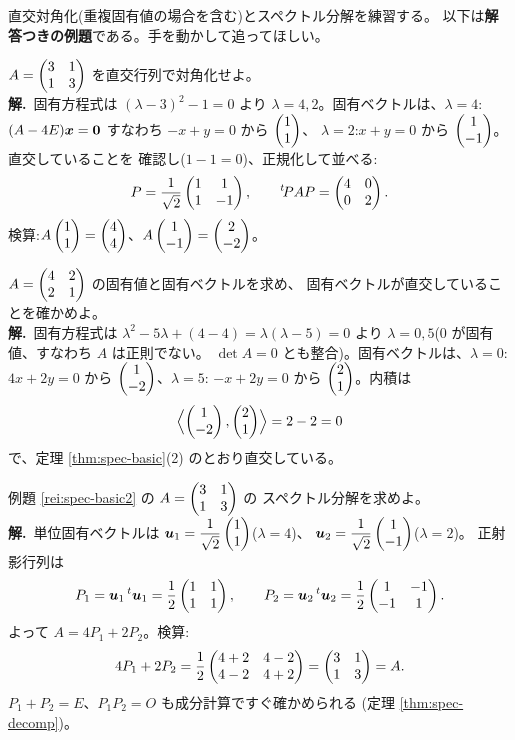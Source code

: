 直交対角化(重複固有値の場合を含む)とスペクトル分解を練習する。
以下は\textbf{解答つきの例題}である。手を動かして追ってほしい。

\begin{rei}[例題・基本($2$ 次の直交対角化)]\label{rei:spec-basic2}
$A = \begin{pmatrix}3 & 1 \\ 1 & 3\end{pmatrix}$ を直交行列で対角化せよ。\\
\textbf{解.}\ 固有方程式は $(\lambda - 3)^2 - 1 = 0$ より
$\lambda = 4, 2$。固有ベクトルは、$\lambda = 4$:
$(A - 4E)\bm{x} = \bm{0}$ すなわち $-x + y = 0$ から $\begin{pmatrix}1 \\ 1\end{pmatrix}$、
$\lambda = 2$:$x + y = 0$ から $\begin{pmatrix}1 \\ -1\end{pmatrix}$。直交していることを
確認し($1 - 1 = 0$)、正規化して並べる:
\[
P = \frac{1}{\sqrt{2}}\begin{pmatrix}1 & 1 \\ 1 & -1\end{pmatrix}, \qquad
{}^t\!PAP = \begin{pmatrix}4 & 0 \\ 0 & 2\end{pmatrix}.
\]
検算:$A\begin{pmatrix}1 \\ 1\end{pmatrix} = \begin{pmatrix}4 \\ 4\end{pmatrix}$、$A\begin{pmatrix}1 \\ -1\end{pmatrix} = \begin{pmatrix}2 \\ -2\end{pmatrix}$。
\end{rei}

\begin{rei}[例題・基本(直交性の検証)]\label{rei:spec-orthcheck}
$A = \begin{pmatrix}4 & 2 \\ 2 & 1\end{pmatrix}$ の固有値と固有ベクトルを求め、
固有ベクトルが直交していることを確かめよ。\\
\textbf{解.}\ 固有方程式は
$\lambda^2 - 5\lambda + (4 - 4) = \lambda(\lambda - 5) = 0$ より
$\lambda = 0, 5$($0$ が固有値、すなわち $A$ は正則でない。
$\det A = 0$ とも整合)。固有ベクトルは、$\lambda = 0$:
$4x + 2y = 0$ から $\begin{pmatrix}1 \\ -2\end{pmatrix}$、$\lambda = 5$:
$-x + 2y = 0$ から $\begin{pmatrix}2 \\ 1\end{pmatrix}$。内積は
\[
\Bigl\langle \begin{pmatrix}1 \\ -2\end{pmatrix}, \begin{pmatrix}2 \\ 1\end{pmatrix} \Bigr\rangle = 2 - 2 = 0
\]
で、定理 \ref{thm:spec-basic}(2) のとおり直交している。
\end{rei}

\begin{rei}[例題・基本(スペクトル分解)]\label{rei:spec-decomp-ex}
例題 \ref{rei:spec-basic2} の $A = \begin{pmatrix}3 & 1 \\ 1 & 3\end{pmatrix}$ の
スペクトル分解を求めよ。\\
\textbf{解.}\ 単位固有ベクトルは
$\bm{u}_1 = \dfrac{1}{\sqrt{2}}\begin{pmatrix}1 \\ 1\end{pmatrix}$($\lambda = 4$)、
$\bm{u}_2 = \dfrac{1}{\sqrt{2}}\begin{pmatrix}1 \\ -1\end{pmatrix}$($\lambda = 2$)。
正射影行列は
\[
P_1 = \bm{u}_1\,{}^t\bm{u}_1 = \frac{1}{2}\begin{pmatrix}1 & 1 \\ 1 & 1\end{pmatrix}, \qquad
P_2 = \bm{u}_2\,{}^t\bm{u}_2 = \frac{1}{2}\begin{pmatrix}1 & -1 \\ -1 & 1\end{pmatrix}.
\]
よって $A = 4P_1 + 2P_2$。検算:
\[
4P_1 + 2P_2 = \frac{1}{2}\begin{pmatrix}4 + 2 & 4 - 2 \\ 4 - 2 & 4 + 2\end{pmatrix}
= \begin{pmatrix}3 & 1 \\ 1 & 3\end{pmatrix} = A.
\]
$P_1 + P_2 = E$、$P_1P_2 = O$ も成分計算ですぐ確かめられる
(定理 \ref{thm:spec-decomp})。
\end{rei}

